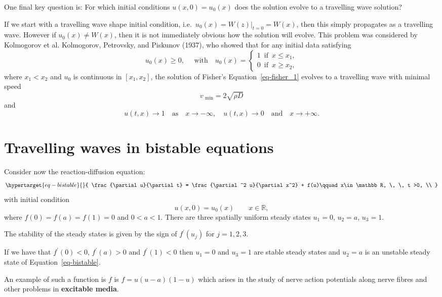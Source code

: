 \documentclass[
  letterpaper,
  DIV=11,
  numbers=noendperiod]{scrreprt}
\theoremstyle{definition}
\theoremstyle{plain}
\theoremstyle{plain}
\theoremstyle{remark}
\begin{document}
One final key question is: For which initial conditions
\(u(x,0) = u_0(x)\) does the solution evolve to a travelling wave
solution?

If we start with a travelling wave shape initial condition,
i.e.~\(u_0(x)= W(z)|_{t=0} = W(x)\), then this simply propagates as a
travelling wave. However if \(u_0(x)\neq W(x)\), then it is not
immediately obvious how the solution will evolve. This problem was
considered by Kolmogorov et al. Kolmogorov, Petrovsky, and Piskunov
(1937), who showed that for any initial data satisfying \[
 u_0(x) \geq 0, \quad \text{ with} \quad  u_0(x) = \begin{cases} 1 \, \text{ if } \, x \leq x_1, \\
 0 \, \text{ if } \, x \geq x_2, 
 \end{cases}
 \] where \(x_1 < x_2\) and \(u_0\) is continuous in \([x_1, x_2]\), the
solution of Fisher's Equation~\ref{eq-fisher_1} evolves to a travelling
wave with minimal speed \[
 v_\text{ min} = 2 \sqrt{ \rho D}
\] and \[
u(t,x) \rightarrow 1 \quad \textrm{as} \quad x\rightarrow -\infty, \quad u(t,x) \rightarrow 0 \quad \textrm{and} \quad  x\rightarrow +\infty.
\]

\hypertarget{travelling-waves-in-bistable-equations}{%
\section{Travelling waves in bistable
equations}\label{travelling-waves-in-bistable-equations}}

Consider now the reaction-diffusion equation:
\begin{equation}\protect\hypertarget{eq-bistable}{}{
 \frac{\partial u}{\partial t} = \frac{\partial^2 u}{\partial x^2} +   f(u)\qquad x\in \mathbb R, \, \, t >0,  \\
}\label{eq-bistable}\end{equation} with initial condition \[
u(x,0)=u_0(x)  \qquad x\in \mathbb R,
\] where \(f(0) = f(a) = f(1)= 0\) and \(0 < a<1\). There are three
spatially uniform steady states \(u_1 =0\), \(u_2 =a\), \(u_3=1\).

The stability of the steady states is given by the sign of
\(f^\prime(u_j)\) for \(j =1,2,3\).

If we have that \(f^\prime (0) < 0\), \(f^\prime(a) >0\) and
\(f^\prime(1) <0\) then \(u_1=0\) and \(u_3=1\) are stable steady states
and \(u_2 =a\) is an unstable steady state of
Equation~\ref{eq-bistable}.

An example of such a function is \(f\) is \(f=u(u-a)(1-u)\) which arises
in the study of nerve action potentials along nerve fibres and other
problems in \textbf{excitable media}.
\end{document}
